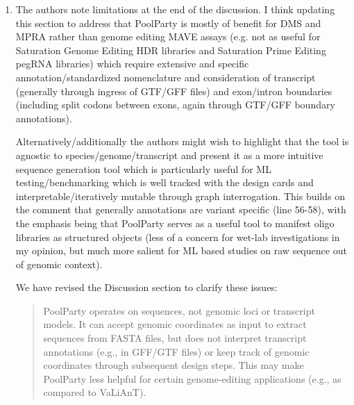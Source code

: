 \documentclass[11pt]{article}
\newenvironment{response}{\par\color{responseblue}}{\par}
\newenvironment{msquote}
  {\begin{quote}\color{quotedtext}\noindent\ignorespaces}
  {\end{quote}}
\begin{document}
\begin{enumerate}
\begin{response}
We appreciate the suggestion to support VCF format. To this end, we have implemented a new method, \texttt{from\_vcf}, which extracts a specified sequence window and inserts alternate alleles into that sequence. We do not, however, see a simple way of exporting libraries in VCF format, as the sequences generated by PoolParty are often not closely related to any specific wild-type sequence. The best option for users who want VCF-formatted output is for them to take the sequences generated by PoolParty, align these sequences to a reference sequence, and use the resulting alignments to generate VCF records. We believe these postprocessing steps are best carried out using other available software. 
\end{response}

\item The authors note limitations at the end of the discussion. I think
updating this section to address that PoolParty is mostly of benefit for DMS and
MPRA rather than genome editing MAVE assays (e.g. not as useful for Saturation
Genome Editing HDR libraries and Saturation Prime Editing pegRNA libraries)
which require extensive and specific annotation/standardized nomenclature and
consideration of transcript (generally through ingress of GTF/GFF files) and
exon/intron boundaries (including split codons between exons, again through
GTF/GFF boundary annotations).

Alternatively/additionally the authors might wish to highlight that the tool is
agnostic to species/genome/transcript and present it as a more intuitive
sequence generation tool which is particularly useful for ML
testing/benchmarking which is well tracked with the design cards and
interpretable/iteratively mutable through graph interrogation. This builds on
the comment that generally annotations are variant specific (line 56-58), with
the emphasis being that PoolParty serves as a useful tool to manifest oligo
libraries as structured objects (less of a concern for wet-lab investigations
in my opinion, but much more salient for ML based studies on raw sequence out of
genomic context).

\begin{response}
We have revised the Discussion section to clarify these issues:

\begin{msquote} 
PoolParty operates on sequences, not genomic loci or transcript models. It can accept genomic coordinates as input to extract sequences from FASTA files, but does not interpret transcript annotations (e.g., in GFF/GTF files) or keep track of genomic coordinates through subsequent design steps. This may make PoolParty less helpful for certain genome-editing applications (e.g., as compared to VaLiAnT).
\end{msquote}
\end{response}


\end{enumerate}
\end{document}
